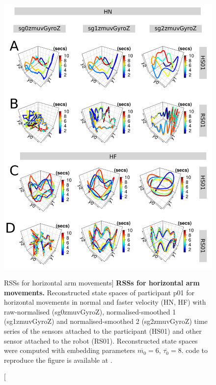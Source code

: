 \begin{figure}
\centering
\includegraphics[height=0.85\textheight]{fig_6_04}
\caption
	[RSSs for horizontal arm movements]{
	{\bf RSSs for horizontal arm movements.}
	Reconstructed state spaces %
	of participant p01 for horizontal movements in normal and faster 
	velocity (HN, HF) with raw-normalised (sg0zmuvGyroZ), 
	normalised-smoothed 1 (sg1zmuvGyroZ) and 
	normalised-smoothed 2 (sg2zmuvGyroZ) time series of the 
	sensors attached to the participant (HS01) and other sensor 
	attached to the robot (RS01).	
	Reconstructed state spaces were computed with 
	embedding parameters $\overline{m_0}=6$, $\overline{\tau_0}=8$.
	\R code to reproduce the figure is available at 
	.
        }
    \label{fig:rss_aHw10}
\end{figure}

